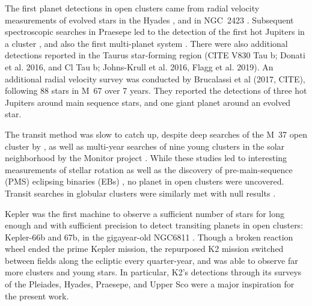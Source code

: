 \documentclass[12pt,twocolumn,tighten]{aastex62}
\begin{document}
The first planet detections in open clusters
came from radial velocity measurements of evolved stars in the Hyades
\citep{Sato_et_al_2007}, and in NGC~2423 \citep{lovis_mayor_2007}.
Subsequent spectroscopic searches in Praesepe led to the detection of the first
hot Jupiters in a cluster \citep{Quinn_et_al_2012}, and also the first
multi-planet system \citep{Malavota_et_al_2016}.
There were also additional detections reported in the Taurus
star-forming region (CITE V830 Tau b; Donati et al. 2016, and Cl Tau
b; Johns-Krull et al. 2016, Flagg et al. 2019).
An additional radial velocity survey was conducted by Brucalassi et al
(2017, CITE), following 88 stars in M~67 over 7 years.  They
reported the detections of three hot Jupiters around main sequence
stars, and one giant planet around an evolved star.

The transit method was slow to catch up, despite deep searches of the
M~37 open cluster by \citet{hartman_MMT_IV_2009}, as well as
multi-year searches of nine young clusters in the solar neighborhood
by the Monitor project
\citep{aigrain_monitor_2007,irwin_monitordata_2007,miller_monitor_2008}.
While these studies led to interesting measurements of stellar
rotation \citep{hartman_rotation_2009,Irwin_NGC2516_2007} as well as
the discovery of pre-main-sequence (PMS) eclipsing binaries (EBs)
\citep{irwin_monitor_PMSEB_2007}, no planet in open clusters were
uncovered.  Transit searches in globular clusters were similarly met
with null results \citep{gilliland_lack_2000,
weldrake_searching_2006}.

Kepler \citep{borucki_kepler_2010} was the first machine to observe a
sufficient number of stars for long enough and with sufficient
precision to detect transiting planets in open clusters:  Kepler-66b
and 67b, in the gigayear-old NGC6811 \citep{Meibom_et_al_2013}.
Though a broken reaction wheel ended the prime Kepler mission, the
repurposed K2 mission \citep{howell_k2_2014} switched between
fields along the ecliptic every quarter-year, and was able to observe
far more clusters and young stars.
In particular, K2's detections through its surveys of the Pleiades,
Hyades, Praesepe, and Upper Sco were a major inspiration for the
present work.
\end{document}
